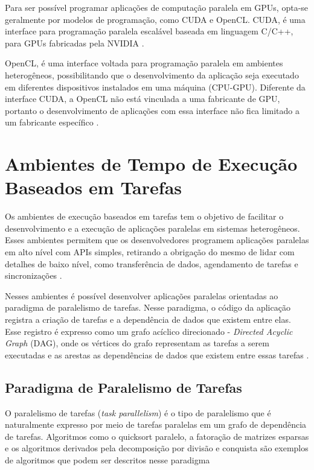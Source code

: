 Para ser possível programar aplicações de computação paralela em GPUs, opta-se geralmente por modelos de programação, como CUDA e OpenCL.
CUDA, é uma interface para programação paralela escalável baseada em linguagem C/C++, para GPUs fabricadas pela NVIDIA \cite{hennessy2014organizaccao}.

OpenCL, é uma interface voltada para programação paralela em ambientes heterogêneos, possibilitando que o desenvolvimento da aplicação seja executado em diferentes dispositivos instalados em uma máquina (CPU-GPU).
Diferente da interface CUDA, a OpenCL não está vinculada a uma fabricante de GPU, portanto o desenvolvimento de aplicações com essa interface não fica limitado a um fabricante específico \cite{opencl:2018}.

\newpage

\section{Ambientes de Tempo de Execução Baseados em Tarefas}
Os ambientes de execução baseados em tarefas tem o objetivo de facilitar o desenvolvimento e a execução de aplicações paralelas em sistemas heterogêneos.
Esses ambientes permitem que os desenvolvedores programem aplicações paralelas em alto nível com APIs simples, retirando a obrigação do mesmo de lidar com detalhes de baixo nível, como transferência de dados, agendamento de tarefas e sincronizações \cite{kumar:tel-01538516}.

Nesses ambientes é possível desenvolver aplicações paralelas orientadas ao paradigma de paralelismo de tarefas.
Nesse paradigma, o código da aplicação registra a criação de tarefas e a dependência de dados que existem entre elas.
Esse registro é expresso como um grafo acíclico direcionado - \textit{Directed Acyclic Graph} (DAG), onde os vértices do grafo representam as tarefas a serem executadas e as arestas as dependências de dados que existem entre essas tarefas \cite{kumar:tel-01538516,thoman2018taxonomy}.

\subsection{Paradigma de Paralelismo de Tarefas}

\begin{citacao}
O paralelismo de tarefas (\textit{task parallelism}) é o tipo de paralelismo que é naturalmente expresso por meio de tarefas paralelas em um grafo de dependência de tarefas.
Algoritmos como o quicksort paralelo, a fatoração de matrizes esparsas e os algoritmos derivados pela decomposição por divisão e conquista são exemplos de algoritmos que podem ser descritos nesse paradigma    %
\end{citacao}

